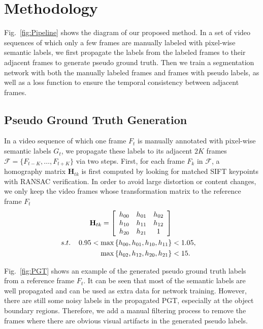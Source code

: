 \section{Methodology}
\label{sec:metho}

Fig.~\ref{fig:Pipeline} shows the diagram of our proposed method. 
In a set of video sequences of which only a few frames are manually labeled with pixel-wise semantic labels, we first propagate the labels from the labeled frames to their adjacent frames to generate pseudo ground truth. 
Then we train a segmentation network with both the manually labeled frames and frames with pseudo labels, as well as a loss function to ensure the temporal consistency between adjacent frames.

\subsection{Pseudo Ground Truth Generation}
%
In a video sequence of which one frame $F_t$ is manually annotated with pixel-wise semantic labels $G_t$, we propagate these labels to its adjacent $2K$ frames $\mathcal{F}=\{F_{t-K},\ldots, F_{t+K}\}$ via two steps.
%
First, for each frame $F_k$ in $\mathcal{F}$, a homography matrix $\mathbf{H}_{tk}$ is first computed by looking for matched SIFT keypoints with RANSAC verification.
%
In order to avoid large distortion or content changes, we only keep the video frames whose transformation matrix to the reference frame $F_t$
% 
\begin{equation}
\centering
\begin{aligned}
\mathbf{H}_{tk}
=
\left[
\begin{array}{ccc}
h_{00} & h_{01} & h_{02}\\
h_{10} & h_{11} & h_{12}\\
h_{20} & h_{21} & 1\\
\end{array}
\right] \\
s.t. \hspace{0.4cm}0.95<\max{\left\{h_{00},h_{01},h_{10},h_{11}\right\}}&<1.05,\\
\max{\left\{h_{02},h_{12},h_{20},h_{21}\right\}}&<15.\\
\end{aligned}
\end{equation}


Fig.~\ref{fig:PGT} shows an example of the generated pseudo ground truth labels from a reference frame $F_t$. 
It can be seen that most of the semantic labels are well propagated and can be used as extra data for network training. 
% 
However, there are still some noisy labels in the propagated PGT, especially at the object boundary regions. 
%
Therefore, we add a manual filtering process to remove the frames where there are obvious visual artifacts in the generated pseudo labels.
%



